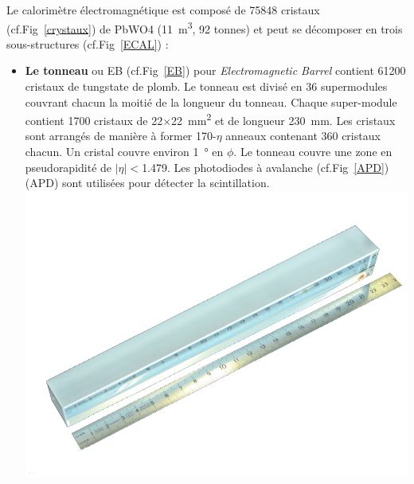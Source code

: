 Le calorimètre électromagnétique est composé de \num{75848} cristaux (cf.Fig~\ref{crystaux}) de PbWO4 (\SI{11}{\cubic\meter}, \num{92} tonnes) et peut se décomposer en trois sous-structures (cf.Fig~\ref{ECAL}) :
\begin{itemize}[label=$\bullet$]
	\item \textbf{Le tonneau} ou EB (cf.Fig~\ref{EB}) pour \textit{Electromagnetic Barrel} contient \num{61200} cristaux de tungstate de plomb. Le tonneau est divisé en \num{36} supermodules couvrant chacun la moitié de la longueur du tonneau. Chaque super-module contient \num{1700} cristaux de \num{22}$\times$\SI{22}{\square\milli\meter} et de longueur \SI{230}{\milli\meter}. Les cristaux sont arrangés de manière à former \num{170}-$\eta$ anneaux contenant \num{360} cristaux chacun. Un cristal couvre environ \SI{1}{\degree} en $\phi$. Le tonneau couvre une zone en pseudorapidité de $|\eta|<$\num{1.479}. Les photodiodes à avalanche (cf.Fig~\ref{APD}) (APD) sont utilisées pour détecter la scintillation.
	\marginpar
	{
		\centering
		\includegraphics[width=\marginparwidth]{CMS/Crystaux.png}
		\label{crystaux}
	}
	

\end{itemize}
